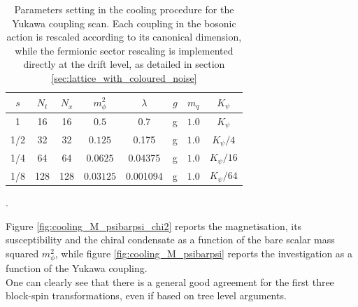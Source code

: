 \begin{table}[htp]
    \centering
    \begin{tabular}{cccccccc}
        \toprule
        $s$ & $N_t$ & $N_x$ & $m_\phi^2$ & $\lambda$ & $g$ & $m_q$& $K_\psi$ \\
        \midrule 
        1 & 16 & 16 & $0.5$ & 0.7 & g & $1.0$ & $K_\psi$ \\
        1/2 & 32 & 32 & $0.125$ & 0.175 & g & $1.0$ & $K_\psi/4$ \\
        1/4 & 64 & 64 & $0.0625$ & 0.04375 & g & $1.0$ & $K_\psi/16$ \\
        1/8 & 128 & 128 & $0.03125$ & 0.001094 & g & $1.0$ & $K_\psi/64$ \\
        \bottomrule
    \end{tabular}
    \caption[Parameter settings in the cooling procedure for the Yukawa coupling scan.]{Parameters setting in the cooling procedure for the Yukawa coupling scan. Each coupling in the bosonic action is rescaled according to its canonical dimension, while the fermionic sector rescaling is implemented directly at the drift level, as detailed in section \ref{sec:lattice_with_coloured_noise}}.
    \label{tab:params_cooling_yukawa}
\end{table}
Figure \ref{fig:cooling_M_psibarpsi_chi2} reports the magnetisation, its susceptibility and the chiral condensate as a function of the bare scalar mass squared $m_\phi^2$, while figure \ref{fig:cooling_M_psibarpsi} reports the investigation as a function of the Yukawa coupling. \\
One can clearly see that there is a general good agreement for the first three block-spin transformations, even if based on tree level arguments.
